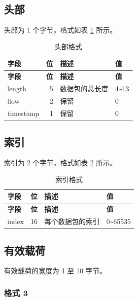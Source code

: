 \documentclass[main\_\_CN.tex]{subfiles}
\begin{document}
\subsection{头部}

头部为 1 个字节，格式如表 \ref{tab:header} 所示。


\begin{longtable}[c]{ |l|r|l|l| }
    \caption{头部格式}
    \label{tab:header}
    \\\hline\rowcolor{lightgray}
    \textbf{字段} & \textbf{位} & \textbf{描述} & \textbf{值}\\\hline
    \endfirsthead
    \hline\rowcolor{lightgray}
    \textbf{字段} & \textbf{位} & \textbf{描述} & \textbf{值}\\\hline
    \endhead
    \endfoot
    \endlastfoot

    length & 5 & 数据包的总长度 & 4\verb+~+13 \\\hline
    flow & 2 & 保留 & 0 \\\hline
    timestamp & 1 & 保留 & 0 \\\hline
 \end{longtable}


\subsection{索引}

索引为 2 个字节，格式如表 \ref{tab:index} 所示。

\begin{longtable}[c]{ |l|r|l|l| }
    \caption{索引格式}
    \label{tab:index}
    \\\hline\rowcolor{lightgray}
    \textbf{字段} & \textbf{位} & \textbf{描述} & \textbf{值}\\\hline
    \endfirsthead
    \textbf{字段} & \textbf{位} & \textbf{描述} & \textbf{值}\\\hline
    \endhead
    \endfoot
    \endlastfoot

    index & 16 & 每个数据包的索引 & 0\verb+~+65535 \\\hline
 \end{longtable}

\subsection{有效载荷}

有效载荷的宽度为 1 至 10 字节。

\subsubsection{格式 3}
\end{document}
